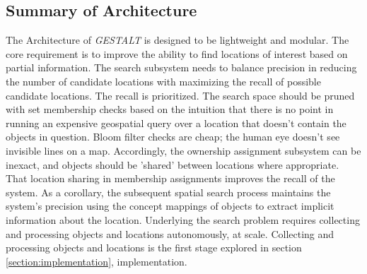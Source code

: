 \subsection{Summary of Architecture}
The Architecture of \textit{GESTALT} is designed to be lightweight and modular. The core requirement is to improve the ability to find locations of interest based on partial information. 
The search subsystem needs to balance precision in reducing the number of candidate locations with maximizing the recall of possible candidate locations. The recall is prioritized. 
The search space should be pruned with set membership checks based on the intuition that there is no point in running an expensive geospatial query over a location that doesn't contain the objects in question. 
Bloom filter checks are cheap; the human eye doesn't see invisible lines on a map. Accordingly, the ownership assignment subsystem can be inexact, and objects should be 'shared' between locations where appropriate. 
That location sharing in membership assignments improves the recall of the system. As a corollary, the subsequent spatial search process maintains the system's precision using the concept mappings of objects to extract implicit information about the location. 
Underlying the search problem requires collecting and processing objects and locations autonomously, at scale. Collecting and processing objects and locations is the first stage explored in section \ref{section:implementation}, implementation. 